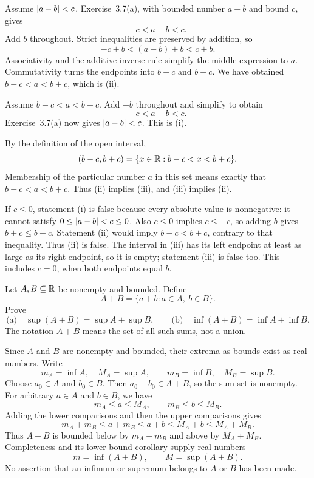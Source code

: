 Assume $\left|a-b\right|<c$. Exercise~3.7(a), with bounded number $a-b$ and
bound $c$, gives
\[
 -c<a-b<c.
\]
Add $b$ throughout. Strict inequalities are preserved by addition, so
\[
 -c+b<(a-b)+b<c+b.
\]
Associativity and the additive inverse rule simplify the middle
expression to $a$. Commutativity turns the endpoints into $b-c$ and
$b+c$. We have obtained $b-c<a<b+c$, which is (ii).

Assume $b-c<a<b+c$. Add $-b$ throughout and simplify to obtain
\[
 -c<a-b<c.
\]
Exercise~3.7(a) now gives $\left|a-b\right|<c$. This is (i).

By the definition of the open interval,
\[
 (b-c,b+c)=\{x\in\mathbb{R}:b-c<x<b+c\}.
\]
Membership of the particular number $a$ in this set means exactly
that $b-c<a<b+c$. Thus (ii) implies (iii), and (iii) implies (ii).

If $c\le0$, statement (i) is false because every absolute value is
nonnegative: it cannot satisfy $0\le\left|a-b\right|<c\le0$.
Also $c\le0$ implies $c\le-c$, so adding $b$ gives
$b+c\le b-c$. Statement (ii) would imply $b-c<b+c$, contrary to
that inequality. Thus (ii) is false. The interval in (iii) has its left
endpoint at least as large as its right endpoint, so it is empty;
statement (iii) is false too. This includes $c=0$, when both endpoints
equal $b$.



\goal Let $A,B\subseteq\mathbb{R}$ be nonempty and bounded. Define
\[
 A+B=\{a+b:a\in A,\ b\in B\}.
\]
Prove
\[
 \text{(a)}\quad\sup(A+B)=\sup A+\sup B,
 \qquad
 \text{(b)}\quad\inf(A+B)=\inf A+\inf B.
\]
The notation $A+B$ means the set of all such sums, not a union.

Since $A$ and $B$ are nonempty and bounded, their extrema as bounds
exist as real numbers. Write
\[
 m_A=\inf A,\quad M_A=\sup A,\qquad
 m_B=\inf B,\quad M_B=\sup B.
\]
Choose $a_0\in A$ and $b_0\in B$. Then $a_0+b_0\in A+B$, so the
sum set is nonempty. For arbitrary $a\in A$ and $b\in B$, we have
\[
 m_A\le a\le M_A,\qquad m_B\le b\le M_B.
\]
Adding the lower comparisons and then the upper comparisons gives
\[
 m_A+m_B\le a+m_B\le a+b\le M_A+b\le M_A+M_B.
\]
Thus $A+B$ is bounded below by $m_A+m_B$ and above by $M_A+M_B$.
Completeness and its lower-bound corollary supply real numbers
\[
 m=\inf(A+B),\qquad M=\sup(A+B).
\]
No assertion that an infimum or supremum belongs to $A$ or $B$ has
been made.

